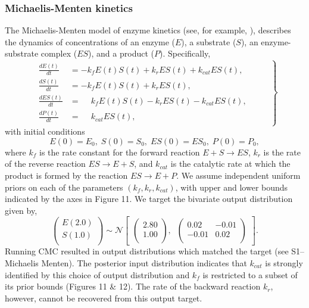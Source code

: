\documentclass[10pt,letterpaper]{article}
\begin{document}
\subsubsection{Michaelis-Menten kinetics}\label{sec:MichaelisMenten}
The Michaelis-Menten model of enzyme kinetics (see, for example, \cite{murray2007mathematical}), describes the dynamics of concentrations of an enzyme ($E$), a substrate ($S$), an enzyme-substrate complex ($ES$), and a product ($P$). Specifically,
%
\begin{equation}
\left .
\begin{gathered}\begin{aligned}
\frac{dE(t)}{dt}  &= -k_f E(t)S(t) + k_r ES(t) + k_{cat} ES(t), \\
\frac{dS(t)}{dt}  &= -k_f E(t)S(t) + k_r ES(t), \\
\frac{dES(t)}{dt} &= \phantom{-}k_f E(t)S(t) - k_r ES(t) - k_{cat} ES(t), \\
\frac{dP(t)}{dt}  &= \phantom{-}k_{cat} ES(t),
\end{aligned}\end{gathered}
\qquad \right \}
\end{equation}
with initial conditions
\begin{equation}
E(0) = E_0, \; S(0)=S_0, \; ES(0)=ES_0, \; P(0)=P_0,
\end{equation}
%
where $k_f$ is the rate constant for the forward reaction $E+S\rightarrow ES$, $k_r$ is the rate of the reverse reaction $ES\rightarrow E+S$, and $k_{cat}$ is the catalytic rate at which the product is formed by the reaction $ES\rightarrow E + P$. We assume independent uniform priors on each of the parameters $(k_f,k_r,k_{cat})$, with upper and lower bounds indicated by the axes in Figure 11. We target the bivariate output distribution given by,
%
\begin{equation}\label{eq:MM_outputDistribution}
\begin{pmatrix}
E(2.0)\\
S(1.0)\\
\end{pmatrix} \sim  \mathcal{N}
\begin{bmatrix}
\begin{pmatrix}
2.80\\
1.00\\
\end{pmatrix}, \;\;
\begin{pmatrix}
0.02 & -0.01\\
-0.01 & 0.02\\
\end{pmatrix}
\end{bmatrix}.
\end{equation}
%
Running CMC resulted in output distributions which matched the target (see S1--Michaelis Menten).
The posterior input distribution indicates that $k_{cat}$ is strongly identified by this choice of output distribution and $k_f$ is restricted to a subset of its prior bounds (Figures 11 \& 12). The rate of the backward reaction $k_r$, however, cannot be recovered from this output target.
\end{document}
